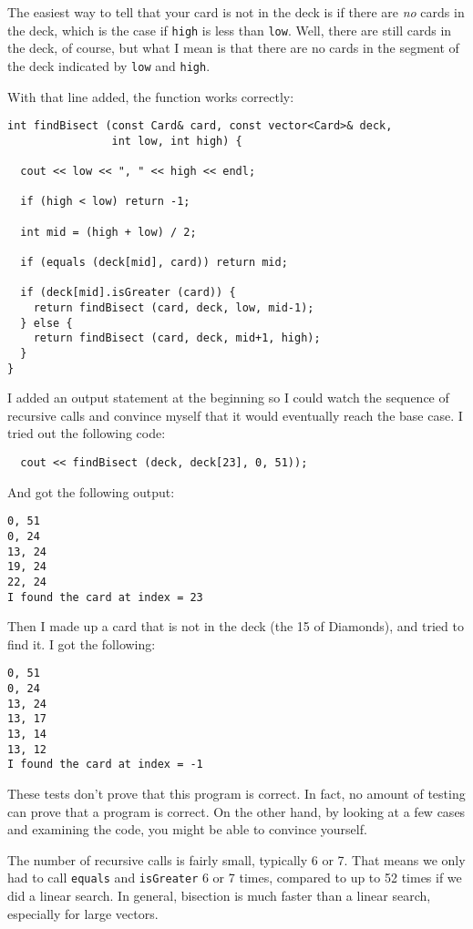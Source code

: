 
The easiest way to tell that your card is not in the deck
is if there are {\em no} cards in the deck, which is the
case if {\tt high} is less than {\tt low}.  Well, there are
still cards in the deck, of course, but what I mean is that
there are no cards in the segment of the deck indicated by
{\tt low} and {\tt high}.

With that line added, the function works correctly:

\begin{lstlisting}
int findBisect (const Card& card, const vector<Card>& deck,
                int low, int high) {

  cout << low << ", " << high << endl;

  if (high < low) return -1;

  int mid = (high + low) / 2;

  if (equals (deck[mid], card)) return mid;

  if (deck[mid].isGreater (card)) {
    return findBisect (card, deck, low, mid-1);
  } else {
    return findBisect (card, deck, mid+1, high);
  }
}
\end{lstlisting}
%
I added an output statement at the beginning so I could watch
the sequence of recursive calls and convince myself
that it would eventually reach the base case.  I tried out the
following code:

\begin{lstlisting}
  cout << findBisect (deck, deck[23], 0, 51));
\end{lstlisting}
%
And got the following output:

\begin{lstlisting}
0, 51
0, 24
13, 24
19, 24
22, 24
I found the card at index = 23
\end{lstlisting}
%
Then I made up a card that is not in the deck (the 15 of Diamonds),
and tried to find it.  I got the following:

\begin{verbatim}
0, 51
0, 24
13, 24
13, 17
13, 14
13, 12
I found the card at index = -1
\end{verbatim}
%
These tests don't prove that this program is correct.  In fact, no
amount of testing can prove that a program is correct.  On the other
hand, by looking at a few cases and examining the code, you might be
able to convince yourself.


The number of recursive calls is fairly small, typically 6 or 7.  That
means we only had to call {\tt equals} and {\tt isGreater} 6 or 7
times, compared to up to 52 times if we did a linear search.  In
general, bisection is much faster than a linear search, especially for
large vectors.

